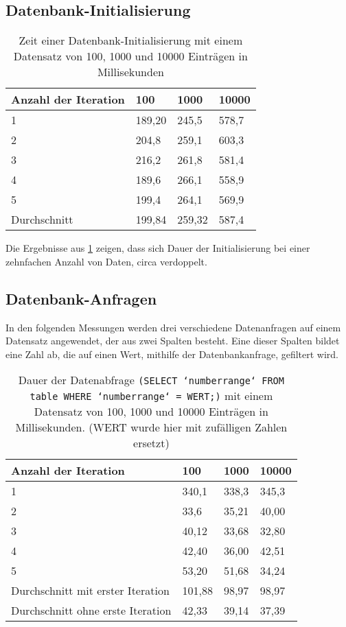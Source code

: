 \subsection{Datenbank-Initialisierung}
\begin{table}[H]
\begin{center}
    \begin{tabular}{| l | l | l | l |}
    \hline
    Anzahl der Iteration & 100 & 1000 & 10000 \\ \hline
    1& 189,20 & 245,5  & 578,7 \\ \hline
    2& 204,8 & 259,1 & 603,3 \\ \hline
    3& 216,2& 261,8 & 581,4 \\ \hline
    4& 189,6 & 266,1 & 558,9 \\ \hline
    5& 199,4 & 264,1 & 569,9 \\ \hline
	Durchschnitt & 199,84 & 259,32 & 587,4\\ \hline
    \end{tabular}
\end{center}
\caption{Zeit einer Datenbank-Initialisierung mit einem Datensatz von 100, 1000 und 10000 Einträgen in Millisekunden}
\label{tabelle_avarage_time}
\end{table}

Die Ergebnisse aus \ref{tabelle_avarage_time} zeigen, dass sich Dauer der Initialisierung bei einer zehnfachen Anzahl von Daten, circa verdoppelt.

\subsection{Datenbank-Anfragen}

In den folgenden Messungen werden drei verschiedene Datenanfragen auf einem Datensatz angewendet, der aus zwei Spalten besteht. Eine dieser Spalten bildet eine Zahl ab, die auf einen Wert, mithilfe der Datenbankanfrage, gefiltert wird.

\begin{table}[H]
\begin{center}
    \begin{tabular}{| l | l | l | l |}
    \hline
    Anzahl der Iteration & 100 & 1000 & 10000 \\ \hline
    1& 340,1 & 338,3  & 345,3 \\ \hline
    2& 33,6 & 35,21 & 40,00\\ \hline
    3& 40,12& 33,68 & 32,80 \\ \hline
    4& 42,40 & 36,00 & 42,51 \\ \hline
    5& 53,20 & 51,68 & 34,24 \\ \hline
	Durchschnitt mit erster Iteration & 101,88 & 98,97 & 98,97\\ \hline
	Durchschnitt ohne erste Iteration & 42,33 & 39,14 & 37,39\\ \hline
    \end{tabular}
\end{center}
\caption{Dauer der Datenabfrage \texttt{(SELECT `numberrange` FROM table WHERE `numberrange` = WERT;)} mit einem Datensatz von 100, 1000 und 10000 Einträgen in Millisekunden. (WERT wurde hier mit zufälligen Zahlen ersetzt)}
\label{equalTabelle}
\end{table}


